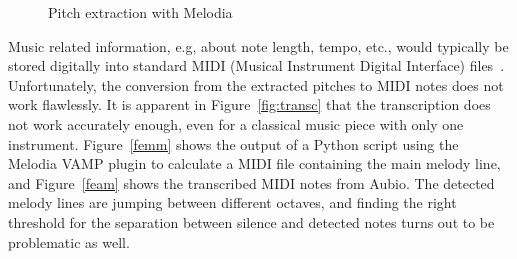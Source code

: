 \begin{figure}[htbp]
	\centering
	\caption{Pitch extraction with Melodia}
	\label{fig:melodia}
\end{figure}

\noindent Music related information, e.g, about note length, tempo, etc., would typically be stored digitally into standard MIDI (Musical Instrument Digital Interface) files~\cite[p. 180]{musicdata}. Unfortunately, the conversion from the extracted pitches to MIDI notes does not work flawlessly. It is apparent in Figure~\ref{fig:transc} that the transcription does not work accurately enough, even for a classical music piece with only one instrument. Figure~\ref{femm} shows the output of a Python script using the Melodia VAMP plugin to calculate a MIDI file containing the main melody line, and Figure~\ref{feam} shows the transcribed MIDI notes from Aubio. The detected melody lines are jumping between different octaves, and finding the right threshold for the separation between silence and detected notes turns out to be problematic as well.

